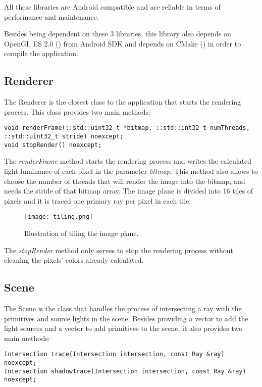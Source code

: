 \par
All these libraries are Android compatible and are reliable in terms of performance and maintenance.

\par
Besides being dependent on these 3 libraries, this library also depends on OpenGL ES 2.0 (\cite{OpenGL_ES_2}) from Android SDK and depends on CMake (\cite{CMake}) in order to compile the application.

\subsection{Renderer}

\par
The Renderer is the closest class to the application that starts the rendering process.
This class provides two main methods:
\begin{lstlisting}
void renderFrame(::std::uint32_t *bitmap, ::std::int32_t numThreads, ::std::uint32_t stride) noexcept;
void stopRender() noexcept;
\end{lstlisting}

\par
The \textit{renderFrame} method starts the rendering process and writes the calculated light luminance of each pixel in the parameter \textit{bitmap}.
This method also allows to choose the number of threads that will render the image into the bitmap, and needs the stride of that bitmap array.
The image plane is divided into 16 tiles of pixels and it is traced one primary ray per pixel in each tile.

\begin{figure}[H]
	\centering
	\caption{Illustration of tiling the image plane.}
	\label{Illustration of tiling the image plane.}
	\texttt{[image: tiling.png]}
\end{figure}

\par
The \textit{stopRender} method only serves to stop the rendering process without cleaning the pixels' colors already calculated.

\subsection{Scene}

\par
The Scene is the class that handles the process of intersecting a ray with the primitives and source lights in the scene.
Besides providing a vector to add the light sources and a vector to add primitives to the scene, it also provides two main methods:
\begin{lstlisting}
Intersection trace(Intersection intersection, const Ray &ray) noexcept;
Intersection shadowTrace(Intersection intersection, const Ray &ray) noexcept;
\end{lstlisting}


